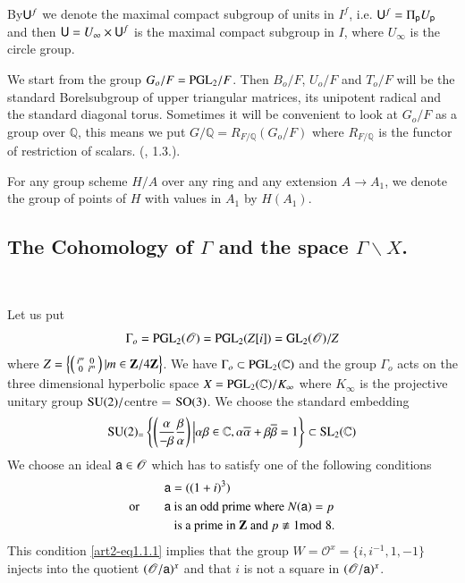 By\pageoriginale $\mathsf{U}^{f}$ we denote the maximal compact subgroup of units in $I^{f}$, i.e. $\mathsf{U}^{f}=\Pi_{\mathsf{p}}U_{\mathsf{p}}$ and then $\mathsf{U}=U_{\infty}\times \mathsf{U}^{f}$ is the maximal compact subgroup in $I$, where $U_{\infty}$ is the circle group.

We start from the group $G_{o}/F=\mathrm{PGL}_{2}/F$. Then $B_{o}/F$, $U_{o}/F$ and $T_{o}/F$ will be the standard Borelsubgroup of upper triangular matrices, its unipotent radical and the standard diagonal torus. Sometimes it will be convenient to look at $G_{o}/F$ as a group over $\mathbb{Q}$, this means we put $G/\mathbb{Q}=R_{F/\mathbb{Q}}(G_{o}/F)$ where $R_{F/\mathbb{Q}}$ is the functor of restriction of scalars. (\cite{art2-key27}, 1.3.).

For any group scheme $H/A$ over any ring and any extension $A\to A_{1}$, we denote the group of points of $H$ with values in $A_{1}$ by $H(A_{1})$.

\subsection{The Cohomology of $\Gamma$ and the space $\Gamma\backslash X$.}\label{art2-sec1.1}
~

Let us put
$$
\Gamma_{o}=\mathrm{PGL}_{2}(\mathscr{O})=\mathrm{PGL}_{2}(Z[i])=\mathrm{GL}_{2}(\mathscr{O})/Z
$$
where $Z=\left\{\left(\begin{smallmatrix} i^{m} & 0\\ 0 & i^{m}\end{smallmatrix}\right)|m\in \mathbf{Z}/4\mathbf{Z}\right\}$. We have $\Gamma_{o}\subset \mathrm{PGL}_{2}(\mathbb{C})$ and the group $\Gamma_{o}$ acts on the three dimensional hyperbolic space $X=\mathrm{PGL}_{2}(\mathbb{C})/K_{\infty}$ where $K_{\infty}$ is the projective unitary group $\mathrm{SU}(2)/$centre = $\mathrm{SO}(3)$. We choose the standard embedding
$$
\mathrm{SU}(2)_=\left\{\left(\frac{\alpha}{-\beta}\frac{\beta}{\alpha}\right) \Big| \alpha\beta\in \mathbb{C}, \alpha\overline{\alpha}+\beta\overline{\beta}=1\right\}\subset \mathrm{SL}_{2}(\mathbb{C})
$$
We choose an ideal $\mathsf{a}\in \mathscr{O}$ which has to satisfy one of the following conditions
\begin{align}
\sfa &= ((1+i)^{3})\label{art2-eq1.1.1}\\
\text{or}\qquad \sfa & \text{~is an odd prime where $N(\sfa)=p$}\notag\\
                     & \text{~is a prime in $\bZ$ and $p\nequiv 1\mod 8$.}\notag
\end{align}
This condition \eqref{art2-eq1.1.1} implies that the group $W=\mathscr{O}^{x}=\{i,i^{-1},1,-1\}$ injects into the quotient $(\mathscr{O}/\mathsf{a})^{x}$ and that $i$ is not a square in $(\mathscr{O}/\mathsf{a})^{x}$.


